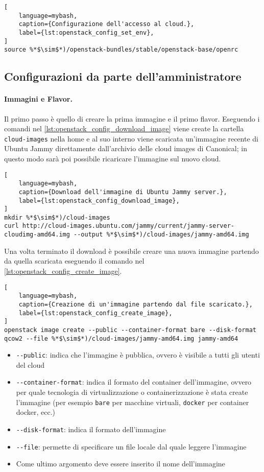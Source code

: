 \begin{lstlisting}[
    language=mybash, 
    caption={Configurazione dell'accesso al cloud.},
    label={lst:openstack_config_set_env},
]
source %*$\sim$*)/openstack-bundles/stable/openstack-base/openrc
\end{lstlisting}


\subsection{Configurazioni da parte dell'amministratore}
\paragraph{Immagini e Flavor.}
Il primo passo è quello di creare la prima immagine e il primo flavor. Eseguendo i comandi nel \cref{lst:openstack_config_download_image} viene create la cartella \verb|cloud-images| nella home e al suo interno viene scaricata un'immagine recente di Ubuntu Jammy direttamente dall'archivio delle cloud images di Canonical; 
in questo modo sarà poi possibile ricaricare l'immagine sul nuovo cloud.

\begin{lstlisting}[
    language=mybash, 
    caption={Download dell'immagine di Ubuntu Jammy server.},
    label={lst:openstack_config_download_image},
]
mkdir %*$\sim$*)/cloud-images
curl http://cloud-images.ubuntu.com/jammy/current/jammy-server-cloudimg-amd64.img --output %*$\sim$*)/cloud-images/jammy-amd64.img
\end{lstlisting}

\noindent
Una volta terminato il download è possibile creare una nuova immagine partendo da quella scaricata eseguendo il comando nel \cref{lst:openstack_config_create_image}.

\begin{lstlisting}[
    language=mybash, 
    caption={Creazione di un'immagine partendo dal file scaricato.},
    label={lst:openstack_config_create_image},
]
openstack image create --public --container-format bare --disk-format qcow2 --file %*$\sim$*)/cloud-images/jammy-amd64.img jammy-amd64
\end{lstlisting}

\begin{itemize}
    \item \verb|--public|: indica che l'immagine è pubblica, ovvero è visibile a tutti gli utenti del cloud
    \item \verb|--container-format|: indica il formato del container dell'immagine, ovvero per quale tecnologia di virtualizzazione o containerizzazione è stata create l'immagine (per esempio \verb|bare| per macchine virtuali, \verb|docker| per container docker, ecc.)
    \item \verb|--disk-format|: indica il formato dell'immagine
    \item \verb|--file|: permette di specificare un file locale dal quale leggere l'immagine
    \item Come ultimo argomento deve essere inserito il nome dell'immagine
\end{itemize}


